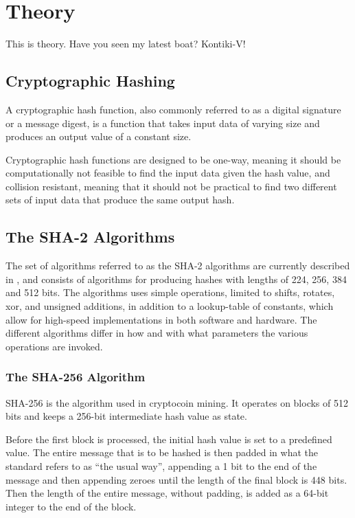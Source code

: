 \chapter{Theory}
This is theory.
Have you seen my latest boat?
Kontiki-V!

\section{Cryptographic Hashing}

A cryptographic hash function, also commonly referred to as a digital signature or
a message digest, is a function that takes input data of varying size and
produces an output value of a constant size\cite{hashing-overview}. %

Cryptographic hash functions are designed to be one-way, meaning it should
be computationally not feasible to find the input data given the hash value,
and collision resistant, meaning that it should not be practical to find two
different sets of input data that produce the same output hash\cite{sha-spec}.

\section{The SHA-2 Algorithms}

The set of algorithms referred to as the SHA-2 algorithms are currently described in \cite{fips180-4},
and consists of algorithms for producing hashes with lengths of 224, 256, 384 and 512 bits.
The algorithms uses simple operations, limited to shifts, rotates, xor, and unsigned additions,
in addition to a lookup-table of constants, which allow for high-speed implementations in both
software and hardware. The different algorithms differ in how and with what parameters the various
operations are invoked.

\subsection{The SHA-256 Algorithm\cite{sha-spec}}

SHA-256 is the algorithm used in cryptocoin mining. It operates on blocks of 512 bits
and keeps a 256-bit intermediate hash value as state.

Before the first block is processed, the initial hash value is set to a predefined
value. The entire message that is to be hashed is then padded in what the standard
refers to as ``the usual way'', appending a 1 bit to the end of the message and then
appending zeroes until the length of the final block is 448 bits. Then the length of
the entire message, without padding, is added as a 64-bit integer to the end of the
block.

